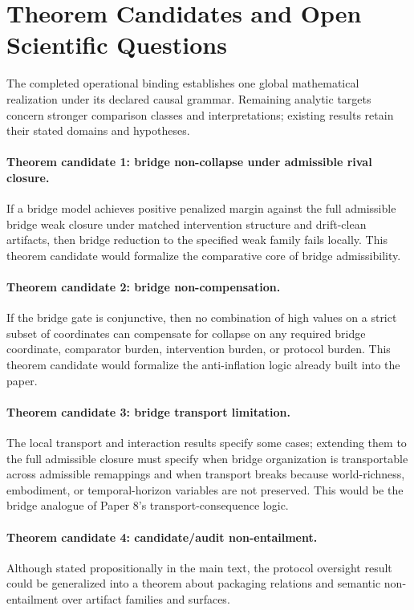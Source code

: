 \documentclass[11pt,a4paper]{article}
\theoremstyle{definition}
\begin{document}
\section{Theorem Candidates and Open Scientific Questions}
The completed operational binding establishes one global mathematical realization under its declared causal grammar. Remaining analytic targets concern stronger comparison classes and interpretations; existing results retain their stated domains and hypotheses.

\paragraph{Theorem candidate 1: bridge non-collapse under admissible rival closure.}
If a bridge model achieves positive penalized margin against the full admissible bridge weak closure under matched intervention structure and drift-clean artifacts, then bridge reduction to the specified weak family fails locally. This theorem candidate would formalize the comparative core of bridge admissibility.

\paragraph{Theorem candidate 2: bridge non-compensation.}
If the bridge gate is conjunctive, then no combination of high values on a strict subset of coordinates can compensate for collapse on any required bridge coordinate, comparator burden, intervention burden, or protocol burden. This theorem candidate would formalize the anti-inflation logic already built into the paper.

\paragraph{Theorem candidate 3: bridge transport limitation.}
The local transport and interaction results specify some cases; extending them to the full admissible closure must specify when bridge organization is transportable across admissible remappings and when transport breaks because world-richness, embodiment, or temporal-horizon variables are not preserved. This would be the bridge analogue of Paper 8's transport-consequence logic.

\paragraph{Theorem candidate 4: candidate/audit non-entailment.}
Although stated propositionally in the main text, the protocol oversight result could be generalized into a theorem about packaging relations and semantic non-entailment over artifact families and surfaces.
\end{document}
